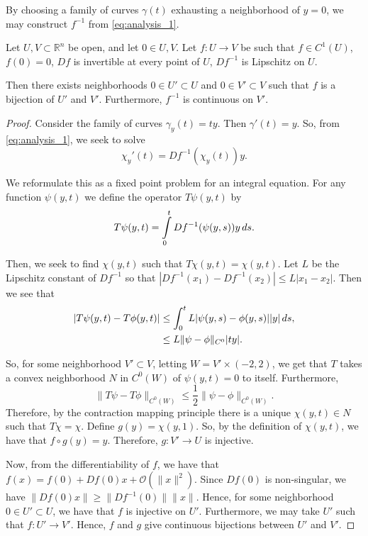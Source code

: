 By choosing a family of curves $\gamma(t)$ exhausting a neighborhood of $y=0$, we may construct $f^{-1}$ from \eqref{eq:analysis_1}.

\begin{proposition}
Let $U, V \subset \mathbb R^n$ be open, and let $0\in U, V$. Let $f: U \to V$ be such that $f\in C^1(U)$, $f(0) = 0$, $Df$ is invertible at every point of $U$, $Df^{-1}$ is Lipschitz on $U$.

Then there exists neighborhoods $0\in U' \subset U$ and $0\in V' \subset V$ such that $f$ is a bijection of $U'$ and $V'$. Furthermore, $f^{-1}$ is continuous on $V'$.
\end{proposition}

\begin{proof}
Consider the family of curves $\gamma_y(t) = ty$. Then $\gamma'(t) = y$. So, from \eqref{eq:analysis_1}, we seek to solve
\begin{equation}
\chi_y'(t) = Df^{-1}(\chi_y(t)) y.
\end{equation}

We reformulate this as a fixed point problem for an integral equation. For any function $\psi(y,t)$ we define the operator $T \psi(y,t) $ by
\begin{equation}
T \psi(y,t) = \int\limits_0^t Df^{-1}(\psi(y,s)) y \, ds.
\end{equation}

Then, we seek to find $\chi(y,t)$ such that $T\chi(y,t) = \chi(y,t)$. Let $L$ be the Lipschitz constant of $Df^{-1}$ so that $|Df^{-1}(x_1) - Df^{-1}(x_2)| \leq L |x_1 - x_2|$. Then we see that
\begin{align}
|T\psi(y,t) - T\phi(y,t)| & \leq \int_0^t L|\psi(y,s) - \phi(y,s)| |y| \, ds,\\
& \leq L  \| \psi - \phi\|_{C^0} |ty|.
\end{align}

So, for some neighborhood $V' \subset V$, letting $W = V'\times(-2, 2)$, we get that $T$ takes a convex neighborhood $N$ in $C^0(W)$ of $\psi(y,t) = 0$ to itself. Furthermore, 
\begin{equation}
\|T\psi - T\phi\|_{C^0(W)} \leq \frac{1}{2} \|\psi - \phi\|_{C^0(W)}.
\end{equation}
Therefore, by the contraction mapping principle there is a unique $\chi(y,t) \in N$ such that $T\chi = \chi$. Define $g(y) = \chi(y,1)$. So, by the definition of $\chi(y,t)$, we have that $f\circ g(y) = y$. Therefore, $g: V' \to U$ is injective.

Now, from the differentiability of $f$, we have that $f(x) = f(0) + Df(0)x + \mathcal O(\|x\|^2)$. Since $Df(0)$ is non-singular, we have $\|Df(0)x\| \geq \|Df^{-1}(0)\| \|x\|$. Hence, for some neighborhood $0\in U'\subset U$, we have that $f$ is injective on $U'$. Furthermore, we may take $U'$ such that $f: U' \to V'$. Hence, $f$ and $g$ give continuous bijections between $U'$ and $V'$.
\end{proof}

